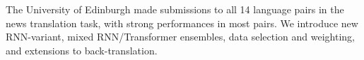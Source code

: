 The University of Edinburgh made submissions to all 14 language pairs in the news translation task, with strong performances in most pairs. We introduce new RNN-variant, mixed RNN/Transformer ensembles, data selection and weighting, and extensions to back-translation.
